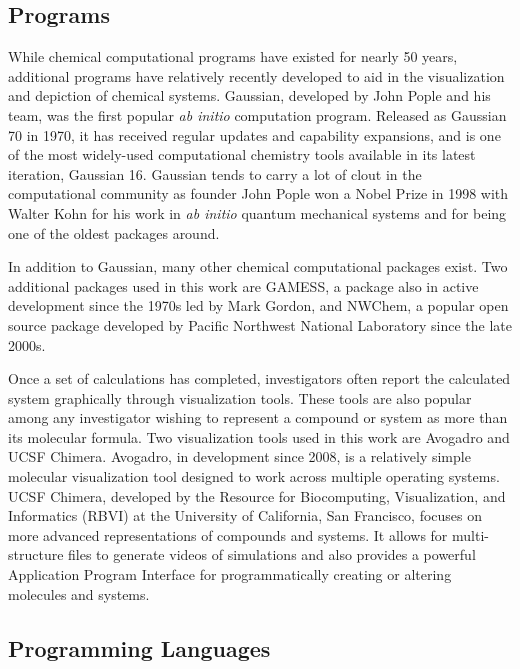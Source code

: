 \subsection{Programs}

While chemical computational programs have existed for nearly 50 years, additional programs have relatively recently developed to aid in the visualization and depiction of chemical systems.
Gaussian, developed by John Pople and his team, was the first popular \textit{ab initio} computation program.
Released as Gaussian 70 in 1970, it has received regular updates and capability expansions, and is one of the most widely-used computational chemistry tools available in its latest iteration, Gaussian 16.
Gaussian tends to carry a lot of clout in the computational community as founder John Pople won a Nobel Prize in 1998 with Walter Kohn for his work in \textit{ab initio} quantum mechanical systems and for being one of the oldest packages around.

In addition to Gaussian, many other chemical computational packages exist.
Two additional packages used in this work are GAMESS,\cite{GAMESS} a package also in active development since the 1970s led by Mark Gordon, and NWChem,\cite{NWChem} a popular open source package developed by Pacific Northwest National Laboratory since the late 2000s.

Once a set of calculations has completed, investigators often report the calculated system graphically through visualization tools.
These tools are also popular among any investigator wishing to represent a compound or system as more than its molecular formula.
Two visualization tools used in this work are Avogadro and UCSF Chimera.
Avogadro, in development since 2008, is a relatively simple molecular visualization tool designed to work across multiple operating systems.\cite{Avogadro}
UCSF Chimera, developed by the Resource for Biocomputing, Visualization, and Informatics (RBVI) at the University of California, San Francisco, focuses on more advanced representations of compounds and systems. It allows for multi-structure files to generate videos of simulations and also provides a powerful Application Program Interface for programmatically creating or altering molecules and systems.\cite{UCSFChimera}

\subsection{Programming Languages}


